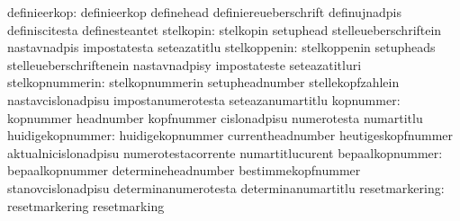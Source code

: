 

                    definieerkop: definieerkop                     definehead
                                  definiereueberschrift            definujnadpis
                                  definiscitesta                   definesteantet
                       stelkopin: stelkopin                        setuphead
                                  stelleueberschriftein            nastavnadpis
                                  impostatesta                     seteazatitlu
                    stelkoppenin: stelkoppenin                     setupheads
                                  stelleueberschriftenein          nastavnadpisy
                                  impostateste                     seteazatitluri
                 stelkopnummerin: stelkopnummerin                  setupheadnumber
                                  stellekopfzahlein                nastavcislonadpisu
                                  impostanumerotesta               seteazanumartitlu
                       kopnummer: kopnummer                        headnumber
                                  kopfnummer                       cislonadpisu
                                  numerotesta                      numartitlu
                huidigekopnummer: huidigekopnummer                 currentheadnumber
                                  heutigeskopfnummer               aktualnicislonadpisu
                                  numerotestacorrente              numartitlucurent
                 bepaalkopnummer: bepaalkopnummer                  determineheadnumber
                                  bestimmekopfnummer               stanovcislonadpisu
                                  determinanumerotesta             determinanumartitlu
                  resetmarkering: resetmarkering                   resetmarking
